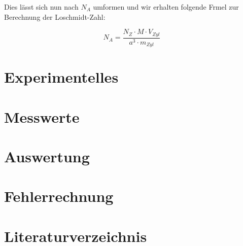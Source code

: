 \documentclass[12pt,a4paper,titlepage,headinclude,bibtotoc]{scrartcl}
\begin{document}
Dies lässt sich nun nach $N_A$ umformen und wir erhalten folgende Frmel zur Berechnung der Loschmidt-Zahl:

\begin{equation}
N_A= \frac{N_Z \cdot M \cdot V_{Zyl}}{a^3 \cdot m_{Zyl}}
\end{equation}
 


\section{Experimentelles}
\section{Messwerte}
\section{Auswertung}
\section{Fehlerrechnung}
\section{Literaturverzeichnis}
\end{document}
